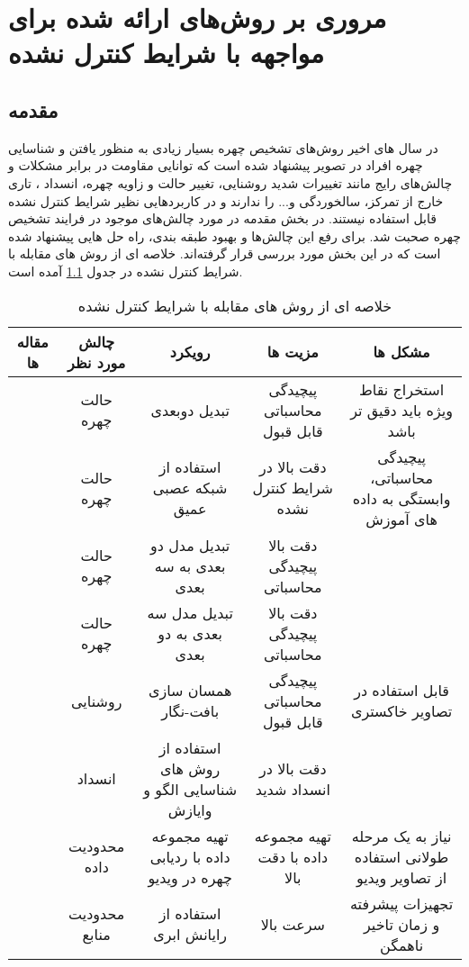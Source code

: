 \chapter{مروری بر روش‌های ارائه شده برای مواجهه با شرایط کنترل نشده}
\section{مقدمه}
در سال های اخیر روش‌های تشخیص چهره بسیار زیادی به منظور یافتن و شناسایی چهره افراد در تصویر پیشنهاد شده است که توانایی مقاومت در برابر مشکلات و چالش‌های رایج مانند تغییرات شدید روشنایی، تغییر حالت و زاویه چهره، انسداد ، تاری خارج از تمرکز، سالخوردگی و... را ندارند و در کاربردهایی نظیر شرایط کنترل نشده قابل استفاده نیستند. در بخش مقدمه در مورد چالش‌های موجود در فرایند تشخیص چهره صحبت شد. برای رفع این چالش‌ها و بهبود طبقه بندی، راه حل هایی پیشنهاد شده است که در این بخش مورد بررسی قرار گرفته‌اند. خلاصه ای از روش های مقابله با شرایط کنترل نشده در جدول \ref{table3-1} آمده است.

\begin{table}[ht]
\caption{خلاصه ای از روش های مقابله با شرایط کنترل نشده}	
\label{table3-1}
\begin{center}
\resizebox{\textwidth}{!}
{
\begin{tabular}{|c|c|c|c|c|}
\hline 
مقاله ها & چالش مورد نظر & رویکرد & مزیت ها & مشکل ها
\\
\hline 
\cite{HAGHIGHAT201623, LV2016465, amos2016openface, 6196234}
& حالت چهره	 & تبدیل دوبعدی & 	پیچیدگی محاسباتی قابل قبول & 	استخراج نقاط ویژه باید دقیق تر باشد
 \\
\hline
\cite{wu2016facial, 7477555, 7780892, 7532959, 7298667}
 & حالت چهره & 	استفاده از شبکه عصبی عمیق & دقت بالا در شرایط کنترل نشده & 	پیچیدگی محاسباتی، وابستگی به داده های آموزش 
\\
\hline
\cite{HU2017366, hassner2014effective, 7298679, 7006757, 6905796}
 & حالت چهره & 	تبدیل مدل دو بعدی به سه بعدی & 	دقت بالا 	پیچیدگی محاسباتی &
\\
\hline 
\cite{DING2017144}
& حالت چهره & 	تبدیل مدل سه بعدی به دو بعدی & 	دقت بالا 	پیچیدگی محاسباتی &
\\
\hline
\cite{6196234, HUSSAINSHAH201597}
 & روشنایی	 & همسان سازی بافت-نگار & 	پیچیدگی محاسباتی قابل قبول & 	قابل استفاده در تصاویر خاکستری
\\
\hline
\cite{7015448, WU2018256}
 & انسداد	 & استفاده از روش های شناسایی الگو و وایازش & 	دقت بالا در انسداد شدید &	
\\
\hline
\cite{7984553}
 & محدودیت داده	 & تهیه مجموعه داده با ردیابی چهره در ویدیو & 	تهیه مجموعه داده با دقت بالا & 	نیاز به یک مرحله طولانی استفاده از تصاویر ویدیو
\\
\hline
\cite{6249269, HU2018582}
 & محدودیت منابع & 	استفاده از رایانش ابری & 	سرعت بالا & 	تجهیزات پیشرفته و زمان تاخیر ناهمگن
\\
\hline
\end{tabular}}
\end{center} 
\end{table}

